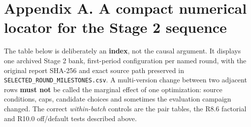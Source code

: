 \section{Appendix A. A compact numerical locator for the Stage 2 sequence}\label{appendix-a.-a-compact-numerical-locator-for-the-stage-2-sequence}

The table below is deliberately an \textbf{index}, not the causal argument. It displays one archived Stage 2 bank, first-period configuration per named round, with the original report SHA-256 and exact source path preserved in \texttt{SELECTED\_ROUND\_MILESTONES.csv}. A multi-version change between two adjacent rows \textbf{must not} be called the marginal effect of one optimization: source conditions, caps, candidate choices and sometimes the evaluation campaign changed. The correct \emph{within-batch} controls are the pair tables, the R8.6 factorial and R10.0 off/default tests described above.

